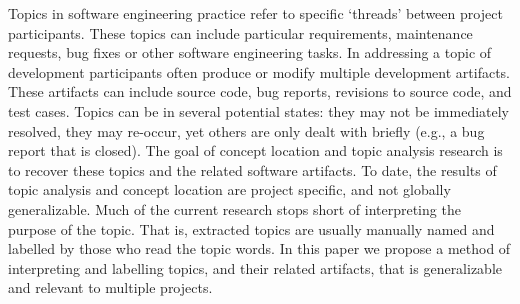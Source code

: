 \documentclass[]{sig-alternate}
\begin{document}
Topics in software engineering practice refer to specific `threads' between project participants. These topics can include particular requirements, maintenance requests, bug fixes or other software engineering tasks. %
In addressing a topic of development participants often produce or modify multiple development artifacts.
%
These artifacts can include source code, bug reports, revisions to source code, and test cases. 
%
Topics can be in several potential states: they may not be immediately resolved, they may re-occur, yet others are only dealt with briefly  (e.g., a bug report that is closed).
The goal of concept location and topic analysis research is to recover these topics and the related software artifacts.
To date, the results of topic analysis and concept location are project specific, and not globally generalizable.
Much of the current research stops short of interpreting the purpose of the topic. That is, extracted topics are usually manually named and labelled by those who read the topic words.
% 
In this paper we propose a method of interpreting and labelling topics, and their related artifacts, that is generalizable and relevant to multiple projects.


\end{document}
